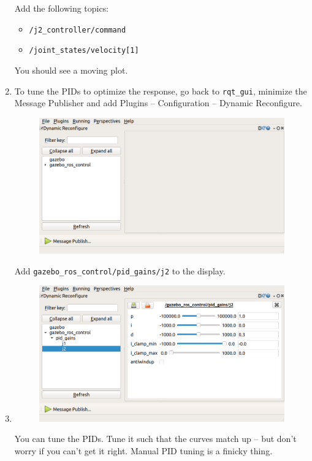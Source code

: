 \documentclass{article}
\begin{document}
\begin{enumerate}
\begin{figure}[H]
            \end{figure}
            Add the following topics:
            \begin{itemize}
                \item \texttt{/j2\_controller/command}
                \item \texttt{/joint\_states/velocity[1]}
            \end{itemize}
            You should see a moving plot. 
            \item To tune the PIDs to optimize the response, go 
            back to \texttt{rqt\_gui}, minimize the Message Publisher and add Plugins -- Configuration -- 
            Dynamic Reconfigure.
            \begin{figure}[H]
                \center
                \includegraphics[width = \textwidth]{image_6.png}
            \end{figure}
            Add \texttt{gazebo\_ros\_control/pid\_gains/j2} to the display.
            \item \begin{figure}[H]
                \center
                \includegraphics[width = \textwidth]{image_7.png}
            \end{figure}
            You can tune the PIDs. Tune it such that the curves match up -- but don't worry
            if you can't get it right. Manual PID tuning is a finicky thing. 
        \end{enumerate}
\end{document}
